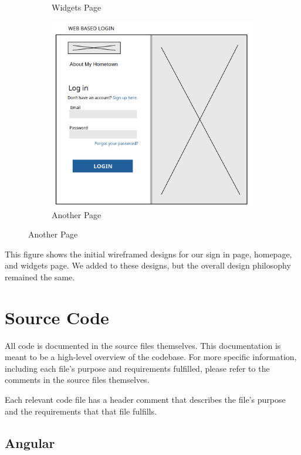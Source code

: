 \documentclass[12pt]{article}
\begin{document}
\begin{figure}[htbp]
\begin{subfigure}[b]{0.48\textwidth}
        \caption{Widgets Page}
    \end{subfigure}
    \centering
    \begin{subfigure}[b]{0.48\textwidth}
        \centering
        \includegraphics[width=\textwidth]{images/sign_in_page.png}
        \caption{Another Page}
    \end{subfigure}
\end{figure}

This figure shows the initial wireframed designs for our sign in page, homepage, and widgets page. We added to these designs, but the overall design philosophy remained the same.

\newpage

\section{Source Code}

All code is documented in the source files themselves. This documentation is meant to be a high-level overview of the codebase. For more specific information, including each file's purpose and requirements fulfilled, please refer to the comments in the source files themselves.

Each relevant code file has a header comment that describes the file's purpose and the requirements that that file fulfills.

\subsection{Angular}
\end{document}
